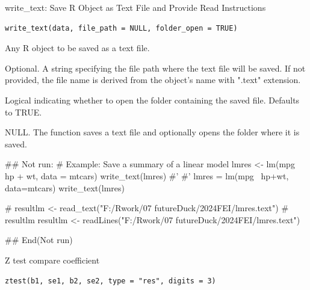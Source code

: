 \documentclass[a4paper]{book}
\begin{document}
%
\begin{Description}
write\_text: Save R Object as Text File and Provide Read Instructions
\end{Description}
%
\begin{Usage}
\begin{verbatim}
write_text(data, file_path = NULL, folder_open = TRUE)
\end{verbatim}
\end{Usage}
%
\begin{Arguments}
\begin{ldescription}
\item[\code{data}] Any R object to be saved as a text file.

\item[\code{file\_path}] Optional. A string specifying the file path where the text file will be saved.
If not provided, the file name is derived from the object's name with ".text" extension.

\item[\code{folder\_open}] Logical indicating whether to open the folder containing the saved file. Defaults to TRUE.
\end{ldescription}
\end{Arguments}
%
\begin{Value}
NULL. The function saves a text file and optionally opens the folder where it is saved.
\end{Value}
%
\begin{Examples}
\begin{ExampleCode}
## Not run: 
# Example: Save a summary of a linear model
lmres <- lm(mpg ~ hp + wt, data = mtcars) %
write_text(lmres)
#'
#'
lmres = lm(mpg~ hp+wt, data=mtcars) %
write_text(lmres)

# resultlm <- read_text("F:/Rwork/07 futureDuck/2024FEI/lmres.text")
# resultlm
resultlm <- readLines("F:/Rwork/07 futureDuck/2024FEI/lmres.text")



## End(Not run)
\end{ExampleCode}
\end{Examples}
%
\begin{Description}
Z test compare coefficient
\end{Description}
%
\begin{Usage}
\begin{verbatim}
ztest(b1, se1, b2, se2, type = "res", digits = 3)
\end{verbatim}
\end{Usage}
\end{document}
